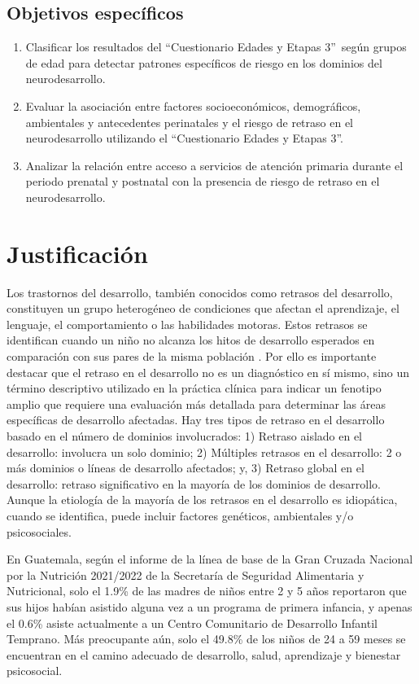 \documentclass[11pt,letterpaper]{report}
\newcommand{\asq}{“Cuestionario Edades y Etapas 3”}
\begin{document}
\section{Objetivos específicos}
	\begin{enumerate}
		\item Clasificar los resultados del \asq\ según grupos de edad para
		detectar patrones específicos de riesgo en los dominios del
		neurodesarrollo.
		
		\item Evaluar la asociación entre factores socioeconómicos,
		demográficos, ambientales y antecedentes perinatales y el riesgo de
		retraso en el neurodesarrollo utilizando el \asq.
		
		\item Analizar la relación entre acceso a servicios de atención
		primaria durante el periodo prenatal y postnatal con la presencia de
		riesgo de retraso en el neurodesarrollo.
	\end{enumerate}

	\chapter{Justificación}
Los trastornos del desarrollo, también conocidos como retrasos del desarrollo,
constituyen un grupo heterogéneo de condiciones que afectan el aprendizaje, el
lenguaje, el comportamiento o las habilidades motoras.
\cite{cdcDevelopmentalDisability} Estos retrasos se identifican cuando un niño
no alcanza los hitos de desarrollo esperados en comparación con sus pares de la
misma población \cite{DevelopmentalSurveillance}. Por ello es importante
destacar que el retraso en el desarrollo no es un diagnóstico en sí mismo, sino
un término descriptivo utilizado en la práctica clínica para indicar un
fenotipo amplio que requiere una evaluación más detallada para determinar las
áreas específicas de desarrollo afectadas. Hay tres tipos de retraso en el
desarrollo basado en el número de dominios involucrados: 1) Retraso aislado en
el desarrollo: involucra un solo dominio; 2) Múltiples retrasos en el
desarrollo: 2 o más dominios o líneas de desarrollo afectados; y, 3) Retraso
global en el desarrollo: retraso significativo en la mayoría de los dominios de
desarrollo. \cite{Bellman2013} Aunque la etiología de la mayoría de los
retrasos en el desarrollo es idiopática, cuando se identifica, puede incluir
factores genéticos, ambientales y/o psicosociales. \cite{DevelopmentalDelay}

En Guatemala, según el informe de la línea de base de la Gran Cruzada Nacional
por la Nutrición 2021/2022 de la Secretaría de Seguridad Alimentaria y
Nutricional, solo el 1.9\% de las madres de niños entre 2 y 5 años reportaron
que sus hijos habían asistido alguna vez a un programa de primera infancia, y
apenas el 0.6\% asiste actualmente a un Centro Comunitario de Desarrollo
Infantil Temprano. Más preocupante aún, solo el 49.8\% de los niños de 24 a 59
meses se encuentran en el camino adecuado de desarrollo, salud, aprendizaje y
bienestar psicosocial. \cite{SESAN2022}
\end{document}
